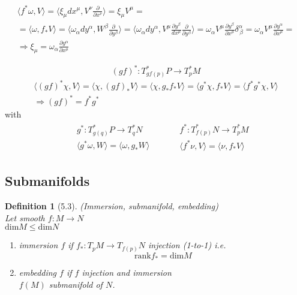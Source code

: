\documentclass{book}
\newtheorem{definition}{Definition}
\newcommand{\exercisehead}[1]
  {\smallskip
   \noindent{\large\bf Exercise #1.}
   }
\begin{document}
\[
\begin{gathered}
  \langle f^* \omega , V \rangle = \langle \xi_{\mu} dx^{\mu}, V^{\nu} \frac{ \partial }{ \partial x^{\nu}} \rangle = \xi_{\mu} V^{\mu} = \\
    = \langle \omega, f_* V \rangle = \langle \omega_{\alpha} dy^{\alpha} , W^{\beta} \frac{ \partial }{ \partial y^{\beta}} \rangle = \langle \omega_{\alpha} dy^{\alpha} , V^{\mu} \frac{ \partial y^{\beta}}{ dx^{\mu} } \frac{ \partial }{ \partial y^{\beta}} \rangle = \omega_{\alpha} V^{\mu} \frac{ \partial y^{\beta}}{ \partial x^{\mu} } \delta^{\alpha}_{ \, \beta} = \omega_{\alpha} V^{\mu} \frac{ \partial y^{ \alpha} }{ \partial x^{\mu} } = \\
    \Longrightarrow \boxed{  \xi_{\mu} = \omega_{\alpha} \frac{ \partial y^{\alpha} }{ \partial x^{\mu} } }
\end{gathered}
\]

\exercisehead{5.5} \[
(gf)^*: T^*_{ gf(p)}P \to T^*_p M
\]
\[
\begin{gathered}
  \langle (gf)^* \chi, V \rangle = \langle \chi, (gf)_* V \rangle = \langle \chi, g_* f_*V \rangle = \langle g^* \chi, f_* V \rangle = \langle f^* g^* \chi, V \rangle \\
  \Longrightarrow (gf)^* = f^* g^*
\end{gathered}
\]
with
\[
\begin{aligned}
  & \begin{aligned}
      & g^* : T^*_{g(q)}P \to T^*_q N \\ 
  & \langle g^* \omega , W \rangle = \langle \omega, g_* W \rangle 
\end{aligned} \quad \, 
  & \begin{aligned}
      & f^* : T^*_{f(p)}N \to T^*_p M \\ 
      & \langle f^* \nu , V \rangle = \langle \nu, f_* V \rangle
    \end{aligned}
\end{aligned}
\]

\subsection{ Submanifolds}

\begin{definition}[5.3] (Immersion, submanifold, embedding) \\
Let smooth $f: M \to N $ \\
$\text{dim}{M} \leq \text{dim}{N}$ 

\begin{enumerate}
\item[(a)] immersion $f$ if $f_* : T_pM \to T_{f(p)} N$ injection (1-to-1) i.e. 
\[
\text{rank}{f_*} = \text{dim}{M}
\]
\item[(b)] embedding $f$ if $f$ injection and immersion \\
$f(M)$ submanifold of $N$.  
\end{enumerate}
\end{definition}
\end{document}
